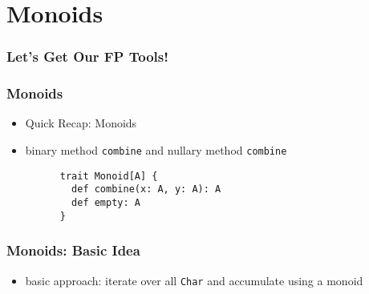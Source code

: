 \documentclass[aspectratio=169]{beamer}
\begin{document}
\section{Monoids}\label{sec:monoids}

\begin{frame}
  \frametitle{Let's Get Our FP Tools!}
\end{frame}

\begin{frame}[fragile]
  \frametitle{Monoids}
  \begin{itemize}
  \item Quick Recap: Monoids
  \item binary method \texttt{combine} and nullary method \texttt{combine}
    \begin{verbatim}
      trait Monoid[A] {
        def combine(x: A, y: A): A
        def empty: A
      }
    \end{verbatim}
  \end{itemize}
\end{frame}

\begin{frame}
  \frametitle{Monoids: Basic Idea}
  \begin{itemize}
  \item basic approach: iterate over all \texttt{Char} and accumulate using a monoid
  \end{itemize}
\end{frame}
\end{document}
